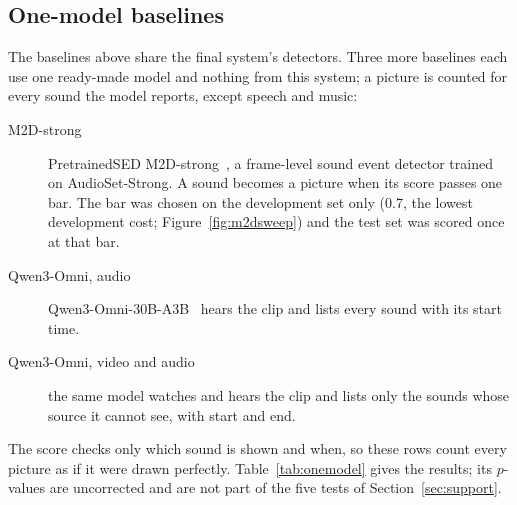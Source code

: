 \subsection{One-model baselines}\label{sec:onemodel}
The baselines above share the final system's detectors. Three more baselines each use one ready-made model and nothing
from this system; a picture is counted for every sound the model reports, except speech and music:
\begin{description}
  \item[M2D-strong] PretrainedSED M2D-strong~\cite{schmid2025pretrainedsed}, a frame-level sound event detector trained
        on AudioSet-Strong. A sound becomes a picture when its score passes one bar. The bar was chosen on the
        development set only (0.7, the lowest development cost; Figure~\ref{fig:m2dsweep}) and the test set was scored once at that bar.
  \item[Qwen3-Omni, audio] Qwen3-Omni-30B-A3B~\cite{xu2025qwen3omni} hears the clip and lists every sound with its start time.
  \item[Qwen3-Omni, video and audio] the same model watches and hears the clip and lists only the sounds whose source it
        cannot see, with start and end.
\end{description}
The score checks only which sound is shown and when, so these rows count every picture as if it were drawn perfectly.
Table~\ref{tab:onemodel} gives the results; its $p$-values are uncorrected and are not part of the five tests of
Section~\ref{sec:support}.

\begin{table}[htbp]
\centering\small
\caption{One-model baselines (development set: cost only; test set: 87 clips, 66 needed sounds). Difference: the final
system's cost minus this system's, per clip, with the 95\,\% interval of the paired clip bootstrap and an uncorrected
two-sided $p$-value. Wrong pictures are split as in Table~\ref{tab:headline} (on screen / other sound / nothing).}
\label{tab:onemodel}
\end{table}


